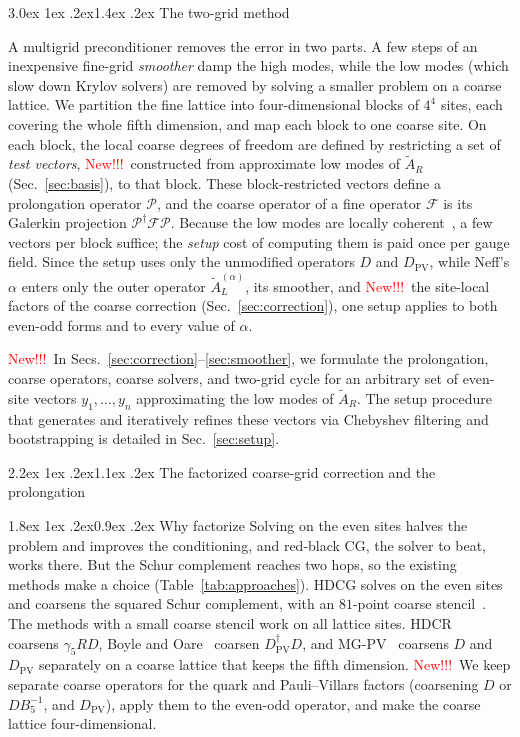 \documentclass[11pt,a4paper]{article}
\makeatletter
\newif\ifshownew \shownewtrue
\DeclareRobustCommand\New{\ifshownew\textcolor{red}{New!!!}\ \else\ignorespaces\fi}
\renewcommand\section{\@startsection{section}{1}{\z@}%
  {3.0ex \@plus 1ex \@minus .2ex}{1.4ex \@plus .2ex}%
  {\centering\normalfont\normalsize\bfseries}}
\renewcommand\subsection{\@startsection{subsection}{2}{\z@}%
  {2.2ex \@plus 1ex \@minus .2ex}{1.1ex \@plus .2ex}%
  {\centering\normalfont\small\bfseries}}
\renewcommand\subsubsection{\@startsection{subsubsection}{3}{\z@}%
  {1.8ex \@plus 1ex \@minus .2ex}{0.9ex \@plus .2ex}%
  {\centering\normalfont\small\bfseries\itshape}}
\newcommand\FloatBarrier{\par\begingroup\let\@elt\relax
  \edef\@tempa{\@botlist\@deferlist\@dbldeferlist}%
  \ifx\@tempa\@empty\else\clearpage\fi\endgroup}
\let\origsection\section
\renewcommand\section{\FloatBarrier\origsection}
\numberwithin{equation}{section}
\newcommand{\dg}{^{\dagger}}
\newcommand{\Dpv}{D_{\mathrm{PV}}}
\newcommand{\AR}{\tilde A_{R}}
\newcommand{\AL}{\tilde A_{L}}
\newcommand{\Pro}{\mathcal P}
\makeatother
\begin{document}
\section{The two-grid method}
\label{sec:method}

A multigrid preconditioner removes the error in two parts. A few steps of an inexpensive fine-grid
\emph{smoother} damp the high modes, while the low modes (which slow down Krylov solvers) are
removed by solving a smaller problem on a coarse lattice. We partition the fine lattice into
four-dimensional blocks of $4^4$ sites, each covering the whole fifth dimension, and map each block
to one coarse site. On each block, the local coarse degrees of freedom are defined by restricting a
set of \emph{test vectors}, \New constructed from approximate low modes of $\AR$
(Sec.~\ref{sec:basis}), to that block. These block-restricted vectors define a prolongation
operator $\Pro$, and the coarse operator of a fine operator $\mathcal F$ is its Galerkin projection
$\Pro\dg \mathcal F\Pro$. Because the low modes are locally coherent~\cite{Luscher}, a few vectors per block
suffice; the \emph{setup} cost of computing them is paid once per gauge field. Since the setup uses
only the unmodified operators $D$ and $\Dpv$, while Neff's $\alpha$ enters only the outer operator
$\AL^{(\alpha)}$, its smoother, and \New the site-local factors of the coarse
correction (Sec.~\ref{sec:correction}), one setup applies to both even-odd forms and to every value
of $\alpha$.

\New In Secs.~\ref{sec:correction}--\ref{sec:smoother}, we formulate the
prolongation, coarse operators, coarse solvers, and two-grid cycle for an arbitrary set of
even-site vectors $y_1,\dots,y_n$ approximating the low modes of $\AR$. The setup procedure that
generates and iteratively refines these vectors via Chebyshev filtering and bootstrapping is
detailed in Sec.~\ref{sec:setup}.

\subsection{The factorized coarse-grid correction and the prolongation}
\label{sec:correction}

\subsubsection{Why factorize}
Solving on the even sites halves the problem and improves the conditioning, and red-black CG,
the solver to beat, works there. But the Schur complement reaches two hops, so the existing
methods make a choice (Table~\ref{tab:approaches}). HDCG solves on the even sites and coarsens the
squared Schur complement, with an $81$-point coarse stencil~\cite{HDCG}. The methods with a small
coarse stencil work on all lattice sites. HDCR~\cite{HDCR} coarsens $\gamma_5RD$, Boyle and
Oare~\cite{BoyleOare} coarsen $\Dpv\dg D$, and MG-PV~\cite{BCHW,BY} coarsens $D$ and $\Dpv$
separately on a coarse lattice that keeps the fifth dimension. \New We keep separate coarse
operators for the quark and Pauli--Villars factors (coarsening $D$ or $DB_5^{-1}$, and $\Dpv$), apply them
to the even-odd operator, and make the coarse lattice four-dimensional.
\end{document}
